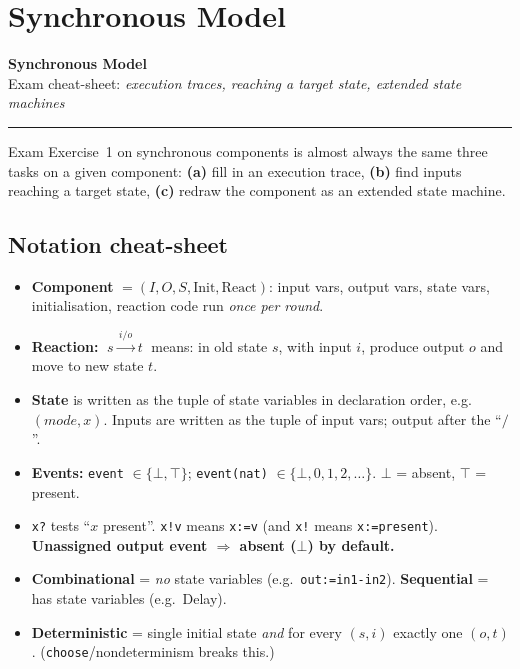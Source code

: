 \chapter{Synchronous Model}

\begin{center}
{\Large\bfseries Synchronous Model}\\[1pt]
{\small Exam cheat-sheet: \emph{execution traces, reaching a target state, extended state machines}}
\end{center}
\hrule
\vspace{4pt}

Exam Exercise~1 on synchronous components is almost always the same three tasks
on a given component:
\textbf{(a)} fill in an execution trace, \textbf{(b)} find inputs reaching a
target state, \textbf{(c)} redraw the component as an extended state machine.

\section{Notation cheat-sheet}

\begin{itemize}
  \item \textbf{Component} $=(I,O,S,\mathrm{Init},\mathrm{React})$: input vars,
        output vars, state vars, initialisation, reaction code run \emph{once per round}.
  \item \textbf{Reaction:} $\;s \xrightarrow{\,i/o\,} t\;$ means: in old state $s$,
        with input $i$, produce output $o$ and move to new state $t$.
  \item \textbf{State} is written as the tuple of state variables in declaration
        order, e.g.\ $(\mathit{mode},x)$. Inputs are written as the tuple of input
        vars; output after the ``$/$''.
  \item \textbf{Events:} \texttt{event} $\in\{\bot,\top\}$;
        \texttt{event(nat)} $\in\{\bot,0,1,2,\dots\}$.
        $\bot$ = absent, $\top$ = present.
  \item \texttt{x?} tests ``$x$ present''. \texttt{x!v} means \texttt{x:=v}
        (and \texttt{x!} means \texttt{x:=present}).
        \textbf{Unassigned output event $\Rightarrow$ absent ($\bot$) by default.}
  \item \textbf{Combinational} = \emph{no} state variables (e.g.\ \texttt{out:=in1-in2}).
        \textbf{Sequential} = has state variables (e.g.\ Delay).
  \item \textbf{Deterministic} = single initial state \emph{and} for every $(s,i)$
        exactly one $(o,t)$. (\texttt{choose}/nondeterminism breaks this.)
\end{itemize}

